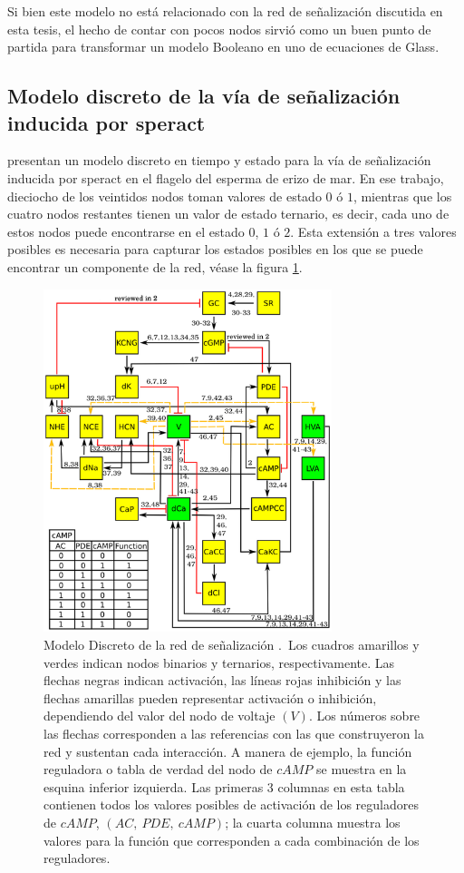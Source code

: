 Si bien este modelo no está relacionado con la red de señalización discutida en esta tesis, el hecho de contar con pocos nodos sirvió como un buen punto de partida para transformar un modelo Booleano en uno de ecuaciones de Glass.

\subsection{Modelo discreto de la vía de señalización inducida por speract}\label{sect:erizo}


\citeauthor{Espinal2011} \citep{Espinal2011} presentan un modelo discreto en tiempo y estado para la vía de señalización inducida por speract en el flagelo del esperma de erizo de mar. En ese trabajo, dieciocho de los veintidos nodos toman valores de estado $0$ ó $1$, mientras que los cuatro nodos restantes tienen un valor de estado ternario, es decir, cada uno de estos nodos puede encontrarse en el estado $0$, $1$ ó $2$. Esta extensión a tres valores posibles es necesaria para capturar los estados posibles en los que se puede encontrar un componente de la red, véase la figura \ref{fig:erizoModelo}.

\begin{figure}[hbt]
\includegraphics[width=0.9\linewidth,height=10cm]{gfx/redErizoModelo}
\caption[Modelo Discreto de la red de se\~nalizaci\'on]{Modelo Discreto de la red de se\~nalizaci\'on \citeauthor{Espinal2011} \citep{Espinal2011}.\ Los cuadros amarillos y verdes indican nodos binarios y ternarios, respectivamente. Las flechas negras indican activación, las líneas rojas inhibición y las flechas amarillas pueden representar activación o inhibición, dependiendo del valor del nodo de voltaje $(V)$. Los números sobre las flechas corresponden a las referencias con las que \citeauthor{Espinal2011} \citep{Espinal2011} construyeron la red y sustentan cada interacción. A manera de ejemplo, la función reguladora o tabla de verdad del nodo de $cAMP$ se muestra en la esquina inferior izquierda. Las primeras 3 columnas en esta tabla contienen todos los valores posibles de activación de los reguladores de $cAMP$, $(AC,\ PDE,\ cAMP)$; la cuarta columna muestra los valores para la función que corresponden a cada combinación de los reguladores.}\label{fig:erizoModelo}
\end{figure}



